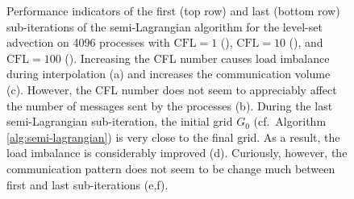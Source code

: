 \begin{figure}[htbp]
\begin{center}
	\end{center}
	\caption{Performance indicators of the first (top row) and last (bottom row) sub-iterations of the semi-Lagrangian algorithm for the level-set advection on 4096 processes with $\text{CFL} = 1$ (), $\text{CFL} = 10$ (), and $\text{CFL} = 100$ (). Increasing the CFL number causes load imbalance during interpolation (a) and increases the communication volume (c). However, the CFL number does not seem to appreciably affect the number of messages sent by the processes (b). During the last semi-Lagrangian sub-iteration, the initial grid $G_0$ (cf.\ Algorithm \ref{alg:semi-lagrangian}) is very close to the final grid. As a result, the load imbalance is considerably improved (d). Curiously, however, the communication pattern does not seem to be change much between first and last sub-iterations (e,f).}
	\label{fig:communication_4096}
\end{figure}

